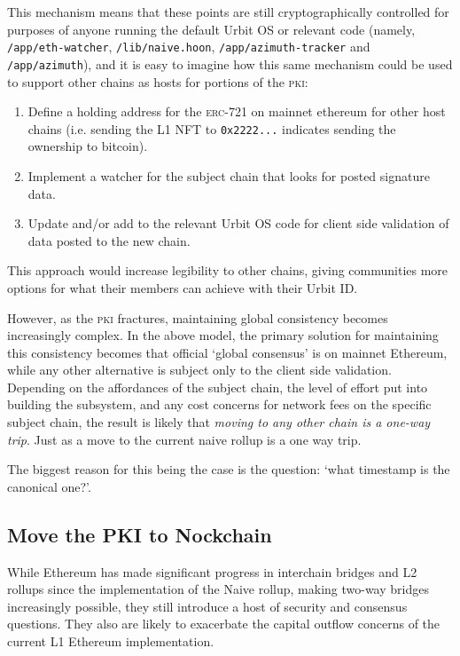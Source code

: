 \documentclass[twoside]{article}
\begin{document}
This mechanism means that these points are still cryptographically controlled for purposes of anyone running the default Urbit OS or relevant code (namely, \lstinline[style=inlinecode]{/app/eth-watcher}, \lstinline[style=inlinecode]{/lib/naive.hoon}, \lstinline[style=inlinecode]{/app/azimuth-tracker} and \lstinline[style=inlinecode]{/app/azimuth}), and it is easy to imagine how this same mechanism could be used to support other chains as hosts for portions of the \textsc{pki}:

\begin{enumerate}
  \item  Define a holding address for the \textsc{erc}-721 on mainnet ethereum for other host chains (i.e. sending the L1 NFT to \lstinline[style=inlinecode]{0x2222...} indicates sending the ownership to bitcoin).
  \item  Implement a watcher for the subject chain that looks for posted signature data.
  \item  Update and/or add to the relevant Urbit OS code for client side validation of data posted to the new chain.
\end{enumerate}

\noindent
This approach would increase legibility to other chains, giving communities more options for what their members can achieve with their Urbit ID. 

However, as the \textsc{pki} fractures, maintaining global consistency becomes increasingly complex. In the above model, the primary solution for maintaining this consistency becomes that official `global consensus' is on mainnet Ethereum, while any other alternative is subject only to the client side validation. Depending on the affordances of the subject chain, the level of effort put into building the subsystem, and any cost concerns for network fees on the specific subject chain, the result is likely that \emph{moving to any other chain is a one-way trip}. Just as a move to the current naive rollup is a one way trip.

The biggest reason for this being the case is the question: `what timestamp is the canonical one?'. 

\subsection[Move the \textsc{pki} to Nockchain]{Move the PKI to Nockchain}

While Ethereum has made significant progress in interchain bridges and L2 rollups since the implementation of the Naive rollup, making two-way bridges increasingly possible, they still introduce a host of security and consensus questions. They also are likely to exacerbate the capital outflow concerns of the current L1 Ethereum implementation.
\end{document}
